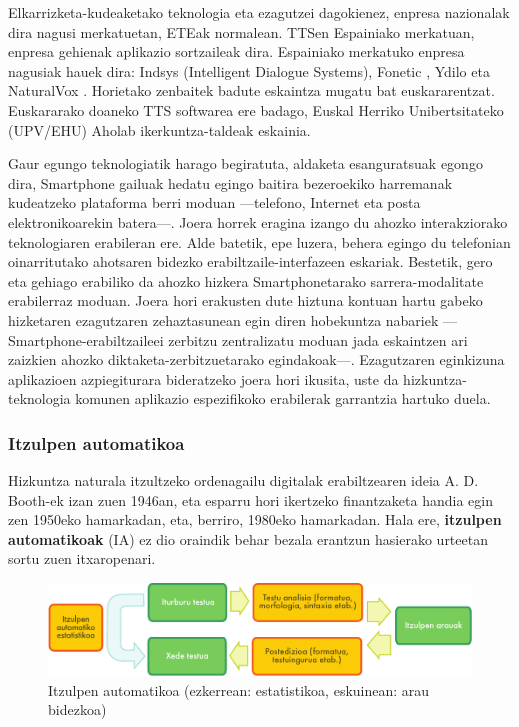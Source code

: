 \begin{multicols}{2}
Elkarrizketa-kudeaketako teknologia eta ezagutzei dagokienez, enpresa nazionalak dira nagusi merkatuetan, ETEak normalean. TTSen Espainiako merkatuan, enpresa gehienak aplikazio sortzaileak dira. Espainiako merkatuko enpresa nagusiak hauek dira: Indsys \cite{BAS-Nota30}  (Intelligent Dialogue Systems), Fonetic \cite{BAS-Nota31}, Ydilo \cite{BAS-Nota32}  eta NaturalVox \cite{BAS-Nota33}. Horietako zenbaitek badute eskaintza mugatu bat euskararentzat. Euskararako doaneko TTS softwarea ere badago, Euskal Herriko Unibertsitateko (UPV/EHU)  Aholab \cite{BAS-Nota34}  ikerkuntza-taldeak eskainia.

Gaur egungo teknologiatik harago begiratuta, aldaketa esanguratsuak egongo dira, Smartphone gailuak hedatu egingo baitira bezeroekiko harremanak kudeatzeko plataforma berri moduan —telefono, Internet eta posta elektronikoarekin batera—. Joera horrek eragina izango du ahozko interakziorako teknologiaren erabileran ere. Alde batetik, epe luzera, behera egingo du telefonian oinarritutako ahotsaren bidezko erabiltzaile-interfazeen eskariak. Bestetik, gero eta gehiago erabiliko da ahozko hizkera Smartphonetarako sarrera-modalitate erabilerraz moduan. Joera hori erakusten dute hiztuna kontuan hartu gabeko hizketaren ezagutzaren zehaztasunean egin diren hobekuntza nabariek —Smartphone-erabiltzaileei zerbitzu zentralizatu moduan jada eskaintzen ari zaizkien ahozko diktaketa-zerbitzuetarako egindakoak—. Ezagutzaren eginkizuna aplikazioen azpiegiturara bideratzeko joera hori ikusita, uste da hizkuntza-teknologia komunen aplikazio espezifikoko erabilerak garrantzia hartuko duela. 

\subsubsection{Itzulpen automatikoa}
  Hizkuntza naturala itzultzeko ordenagailu digitalak erabiltzearen ideia A. D. Booth-ek izan zuen 1946an, eta esparru hori ikertzeko finantzaketa handia egin zen 1950eko hamarkadan, eta,  berriro, 1980eko hamarkadan. Hala ere, \textbf{itzulpen automatikoak} (IA) ez dio oraindik behar bezala erantzun hasierako urteetan sortu zuen itxaropenari. 


\begin{figure}[htb]
  \vspace{-21mm}
  \center
  \includegraphics[width=\textwidth]{../_media/basque/machine_translation}
  \vspace{-2mm}
  \caption{Itzulpen automatikoa (ezkerrean: estatistikoa, eskuinean: arau bidezkoa)}
  \label{fig:mtarch_eu}
\end{figure}


\end{multicols}
